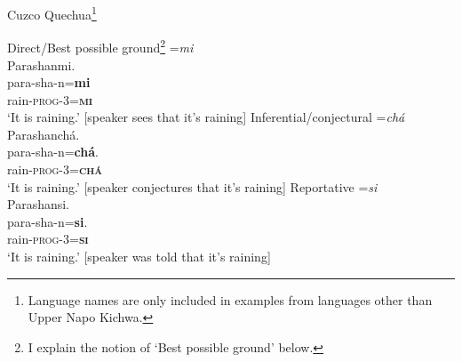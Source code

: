 \documentclass[output=paper]{langscibook}
\begin{document}
\begin{exe} 
\ex Cuzco Quechua\footnote{Language names are only included in examples from languages other than Upper Napo Kichwa.}\label{ex:kg1} 
\begin{xlist} 
	\ex Direct/Best possible ground\footnote{I explain the notion of ‘Best possible ground’ below.} =\textit{mi}\\
		\glll Parashanmi.\\
		para-sha-n=\textbf{mi} \\
		rain-\textsc{prog}-3=\textbf{\textsc{mi}} \\
		\trans ‘It is raining.’ [speaker sees that it’s raining]
	\ex Inferential/conjectural =\textit{chá}\\
		\glll Parashanchá.\\
		para-sha-n=\textbf{chá}.\\
		rain-\textsc{prog}-3=\textbf{\textsc{chá}}\\
		\trans ‘It is raining.’ [speaker conjectures that it’s raining]
	\ex Reportative =\textit{si}\\
		\glll Parashansi.\\
		para-sha-n=\textbf{si}.\\
		rain-\textsc{prog}-3=\textbf{\textsc{si}}\\
        \trans ‘It is raining.’ [speaker was told that it’s raining]	
\end{xlist}
\end{exe}
\end{document}
